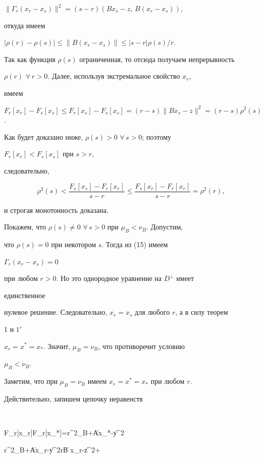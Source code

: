 $\|\Gamma_r(x_r-x_s)\|^2=(s-r)(B x_s-z,\, B(x_r-x_s))$, 


откуда имеем 


$|\rho(r)-\rho(s)|\le\|B(x_r-x_s)\|\le |s-r|\rho(s)/r$. 


Так как функция $\rho(s)$ ограниченная, то отсюда получаем непрерывность  


$\rho(r)$ $\forall\,r>0$. Далее, используя экстремальное свойство $x_r$, 


имеем 


$F_r[x_r]-F_s[x_s]\le F_r[x_s]-F_s[x_s]=(r-s) \|B 


x_s-z\|^2=(r-s)\rho^2(s)$. 


Как будет доказано ниже, $\rho(s)>0$ $\forall\,s>0$; поэтому 


$F_r[x_r]<F_s[x_s]$ при $s>r$, 


следовательно, 


$$ 


\rho^2(s)<\frac{F_s[x_s]-F_r[x_r]}{s-r}\le 


\frac{F_s[x_r]-F_r[x_r]}{s-r}=\rho^2(r), 


$$ 


и строгая монотонность доказана.  


 


Покажем, что $\rho(s)\ne0$ $\forall\,s>0$ при $\mu_B<\nu_B$. Допустим, 


что $\rho(s)=0$ при некотором $s$. Тогда из (15) имеем 


$\Gamma_r(x_r-x_s)=0$ 


при любом $r>0$. Но это однородное уравнение на $D^\bot$ имеет 


единственное  


нулевое решение. Следовательно, $x_r=x_s$ для любого $r$, а в силу теорем 


1 и $1'$\; 


$x_r=x^*=x_*$. Значит, $\mu_B=\nu_B$, что противоречит условию 


$\mu_B<\nu_B$. 


 


Заметим, что при $\mu_B=\nu_B$ имеем $x_r=x^*=x_*$ при любом $r$.  


Действительно, запишем цепочку неравенств 


$$ 


F_r[x_r]\le F_r[x_*]=r\nu^2_B+\|Ax_*-y\|^2\le 


r\mu^2_B+\|Ax_r-y\|^2\le r\|B x_r-z\|^2+ 


